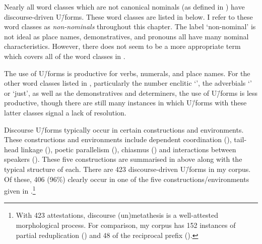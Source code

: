 Nearly all word classes which are not canonical nominals
(as defined in ) have discourse-driven U\=/forms.
These word classes are listed in  below.
I refer to these word classes as \emph{non-nominals} throughout this chapter.
The label `non-nominal' is not ideal as place names,
demonstratives, and pronouns all have many nominal characteristics.
However, there does not seem to be a more appropriate term
which covers all of the word classes in .

\begin{exe}
	\label{ex:WorClaDisMet}
		\begin{xlist}
		\end{xlist}
\end{exe}

The use of U\=/forms is productive for verbs, numerals, and place names.
For the other word classes listed in ,
particularly the number enclitic  `{\ein}',
the adverbials  `{\een}' or  `just',
as well as the demonstratives and determiners,
the use of U\=/forms is less productive, though there
are still many instances in which U\=/forms with
these latter classes signal a lack of resolution.

Discourse U\=/forms typically occur in certain constructions and environments.
These constructions and environments include dependent coordination (),
tail-head linkage (), poetic parallelism (),
chiasmus () and interactions between speakers ().
These five constructions are summarised in 
above along with the typical structure of each.
There are 423 discourse-driven U\=/forms in my corpus.
Of these, 406 (96\%) clearly occur in one of the five
constructions/environments given in .\footnote{
		With 423 attestations, discourse (un)metathesis is a
		well-attested morphological process.
		For comparison, my corpus has 152 instances of partial reduplication ()
		and 48 of the reciprocal prefix  ().}

